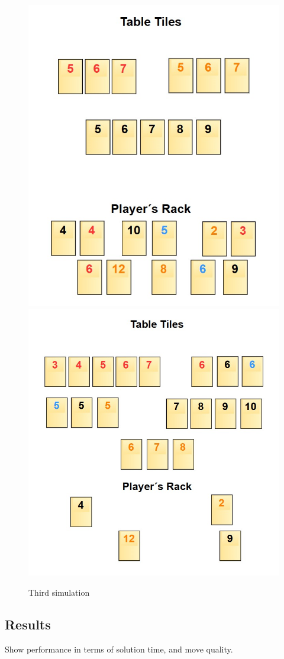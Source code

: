 \documentclass[11pt,letterpaper]{article}
\begin{document}
\begin{figure}[H]
    \centering
    \includegraphics[width=.8\textwidth]{Figures/Initial_Board_3.png}
    \includegraphics[width=.8\textwidth]{Figures/Final_Board_3.png}
    \caption{Third simulation}
\end{figure}

\subsection*{Results}
Show performance in terms of solution time, and move quality.
\end{document}
